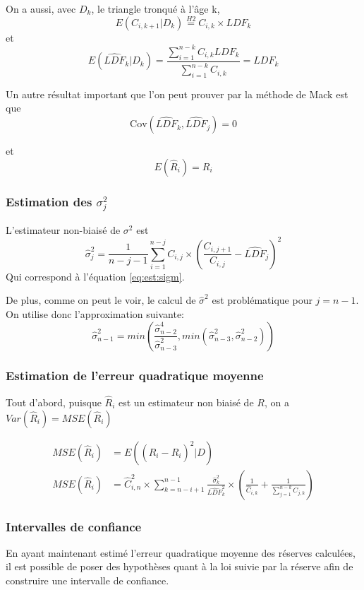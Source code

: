 On a aussi, avec $D_k$, le triangle tronqué à l'âge k, 
$$E(C_{i,k+1}|D_k) \overset{H2}{=} C_{i,k} \times LDF_k$$
et 
$$E(\widehat{LDF}_k|D_k)= \frac{\sum_{i=1}^{n-k} C_{i,k}LDF_k}{\sum_{i=1}^{n-k} C_{i,k}}=LDF_k$$

Un autre résultat important que l'on peut prouver par la méthode de Mack est que
$$\text{Cov}(\widehat{LDF}_k,\widehat{LDF}_j)=0$$

et
$$E(\widehat{R}_i)=R_i$$

\subsubsection*{ Estimation des $\sigma_j^2$}

L'estimateur non-biaisé de $\sigma^2$ est
$$\boxed{\widehat{\sigma}_j^2 = \frac{1}{n-j-1}\sum_{i=1}^{n-j}C_{i,j} \times \left(\frac{C_{i,j+1}}{C_{i,j}}-\widehat{LDF}_j \right)^2}$$
Qui correspond à l'équation \ref{eq:est:sigm}.

De plus, comme on peut le voir, le calcul de $\widehat{\sigma}^2$ est problématique pour $j=n-1$. On utilise donc l'approximation suivante:
$$\boxed{\widehat{\sigma}_{n-1}^2=min \left(\frac{\widehat{\sigma}_{n-2}^4}{\widehat{\sigma}_{n-3}^2},min \left(\widehat{\sigma}_{n-3}^2,\widehat{\sigma}_{n-2}^2 \right) \right)}$$

\subsubsection*{Estimation de l'erreur quadratique moyenne}

Tout d'abord, puisque $\widehat{R}_i$ est un estimateur non biaisé de $R$, on a $Var(\widehat{R}_i)=MSE(\widehat{R}_i)$

$$\boxed{\begin{aligned}
MSE(\widehat{R}_i) &= E\left((\widehat{R}_i-R_i)^2 | D \right) \\
MSE(\widehat{R}_i) &= \widehat{C}_{i,n}^2 \times \sum_{k=n-i+1}^{n-1} \frac{\widehat{\sigma}_k^2}{\widehat{LDF}_k^2} \times \left(\frac{1}{\widehat{C}_{i,k}}+ \frac{1}{\sum_{j=1}^{n-k} C_{j,k}} \right)
\end{aligned}}$$

\subsubsection*{ Intervalles de confiance}

En ayant maintenant estimé l'erreur quadratique moyenne des réserves calculées, il est possible de poser des hypothèses quant à la loi suivie par la réserve afin de construire une intervalle de confiance.

